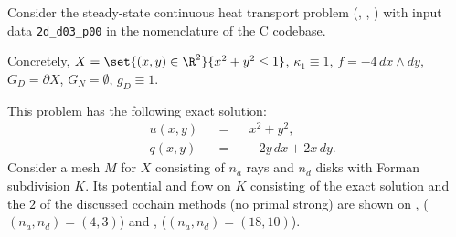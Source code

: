 \begin{example}
  \label{idec/diffusion/continuous/steady_state/examples/2d_d03_p00-example}
  Consider the steady-state continuous heat transport problem
  (,
   ,
   )
  with input data \verb|2d_d03_p00| in the nomenclature of the C codebase.

  Concretely,
    $X = \set{(x, y) \in \R^2}{x^2 + y^2 \leq 1}$,
    $\kappa_1 \equiv 1$,
    $f = - 4 \, d x \wedge d y$,
    $G_D = \partial X$,
    $G_N = \emptyset$,
    $g_D \equiv 1$.

  This problem has the following exact solution:
  \begin{subequations}
    \begin{alignat}{3}
      & u(x, y) && = && x^2 + y^2, \\
      & q(x, y) && = && -2 y \, d x + 2 x \, d y.
    \end{alignat}
  \end{subequations}
  Consider a mesh $M$ for $X$ consisting of $n_a$ rays and $n_d$ disks
  with Forman subdivision $K$.
  Its potential and flow on $K$ consisting of the exact solution and the $2$
  of the discussed cochain methods (no primal strong) are shown on
  ,
  ($(n_a, n_d) = (4, 3)$)
  and
  ,
  ($(n_a, n_d) = (18, 10)$).
\end{example}
